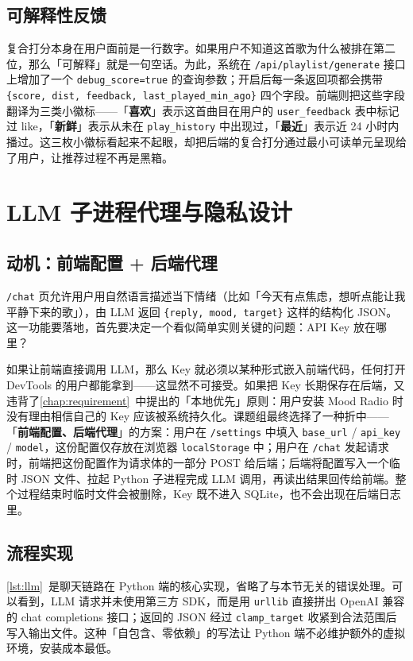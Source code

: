 \subsection{可解释性反馈}

复合打分本身在用户面前是一行数字。如果用户不知道这首歌为什么被排在第二位，那么「可解释」就是一句空话。为此，系统在 \texttt{/api/playlist/generate} 接口上增加了一个 \texttt{debug\_score=true} 的查询参数；开启后每一条返回项都会携带 \verb|{score, dist, feedback, last_played_min_ago}| 四个字段。前端则把这些字段翻译为三类小徽标——「\textbf{喜欢}」表示这首曲目在用户的 \texttt{user\_feedback} 表中标记过 like，「\textbf{新鲜}」表示从未在 \texttt{play\_history} 中出现过，「\textbf{最近}」表示近 24 小时内播过。这三枚小徽标看起来不起眼，却把后端的复合打分通过最小可读单元呈现给了用户，让推荐过程不再是黑箱。

\section{LLM 子进程代理与隐私设计}

\subsection{动机：前端配置 + 后端代理}

\texttt{/chat} 页允许用户用自然语言描述当下情绪（比如「今天有点焦虑，想听点能让我平静下来的歌」），由 LLM 返回 \texttt{\{reply, mood, target\}} 这样的结构化 JSON。这一功能要落地，首先要决定一个看似简单实则关键的问题：API Key 放在哪里？

如果让前端直接调用 LLM，那么 Key 就必须以某种形式嵌入前端代码，任何打开 DevTools 的用户都能拿到——这显然不可接受。如果把 Key 长期保存在后端，又违背了\cref{chap:requirement}~中提出的「本地优先」原则：用户安装 Mood Radio 时没有理由相信自己的 Key 应该被系统持久化。课题组最终选择了一种折中——「\textbf{前端配置、后端代理}」的方案：用户在 \texttt{/settings} 中填入 \texttt{base\_url} / \texttt{api\_key} / \texttt{model}，这份配置仅存放在浏览器 \texttt{localStorage} 中；用户在 \texttt{/chat} 发起请求时，前端把这份配置作为请求体的一部分 POST 给后端；后端将配置写入一个临时 JSON 文件、拉起 Python 子进程完成 LLM 调用，再读出结果回传给前端。整个过程结束时临时文件会被删除，Key 既不进入 SQLite，也不会出现在后端日志里。

\subsection{流程实现}

\cref{lst:llm}~是聊天链路在 Python 端的核心实现，省略了与本节无关的错误处理。可以看到，LLM 请求并未使用第三方 SDK，而是用 \texttt{urllib} 直接拼出 OpenAI 兼容的 chat completions 接口；返回的 JSON 经过 \texttt{clamp\_target} 收紧到合法范围后写入输出文件。这种「自包含、零依赖」的写法让 Python 端不必维护额外的虚拟环境，安装成本最低。

